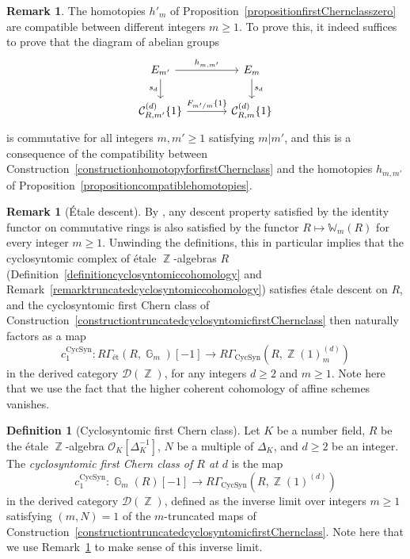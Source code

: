 \documentclass[10pt,twoside]{scrarticle}
\newlength{\mar} \setlength{\mar}{1cm}%
\newlength{\len}
\theoremstyle{definition}
\newtheorem{remark}[theorem]{Remark}
\newtheorem{definition}[theorem]{Definition}
\DeclareMathOperator{\Z}{\mathbb{Z}}
\DeclareMathOperator{\G}{\mathbb{G}}
\newcommand{\CycSyn}{\mathrm{CycSyn}}
\newcommand{\W}{\mathbb{W}}
\renewcommand{\ge}{\geqslant}
\numberwithin{equation}{theorem}
\begin{document}
\begin{remark}\label{remarklimitovermfirstChernclass}
    The homotopies $h'_m$ of Proposition~\ref{propositionfirstChernclasszero} are compatible between different integers $m \ge 1$. To prove this, it indeed suffices to prove that the diagram of abelian groups
    $$\begin{tikzcd}[column sep = large]
        E_{m'} \arrow[r,"h_{m,m'}"] \arrow[d,"s_d"'] & E_m \arrow[d,"s_d"] \\
    \mathcal{C}^{(d)}_{R,m'}\{1\} \arrow[r,"F_{m'/m}\{1\}"] & \mathcal{C}^{(d)}_{R,m}\{1\}
    \end{tikzcd}$$
    is commutative for all integers $m,m' \ge 1$ satisfying $m|m'$, and this is a consequence of the compatibility between Construction~\ref{constructionhomotopyforfirstChernclass} and the homotopies $h_{m,m'}$ of Proposition~\ref{propositioncompatiblehomotopies}.
\end{remark}

\begin{remark}[\'Etale descent]\label{remarketaledescent}
    By \cite[Proposition~2.15]{wagner_q-witt_2024}, any descent property satisfied by the identity functor on commutative rings is also satisfied by the functor $R \mapsto \W_m(R)$ for every integer $m \ge 1$. Unwinding the definitions, this in particular implies that the cyclosyntomic complex of étale $\Z$\nobreakdash-algebras $R$ (Definition~\ref{definitioncyclosyntomiccohomology} and Remark~\ref{remarktruncatedcyclosyntomiccohomology}) satisfies étale descent on $R$, and the cyclosyntomic first Chern class of Construction~\ref{constructiontruncatedcyclosyntomicfirstChernclass} then naturally factors as a map
    $$c_1^{\CycSyn} : R\Gamma_{\text{ét}}(R,\G_m)[-1] \longrightarrow R\Gamma_{\CycSyn}(R,\Z(1)^{(d)}_m)$$
    in the derived category $\mathcal{D}(\Z)$, for any integers $d \ge 2$ and $m \ge 1$. Note here that we use the fact that the higher coherent cohomology of affine schemes vanishes.
\end{remark}

\begin{definition}[Cyclosyntomic first Chern class]\label{definitioncyclosyntomicfirstChernclass}
    Let $K$ be a number field, $R$ be the étale $\Z$\nobreakdash-algebra $\mathcal{O}_K[\Delta_K^{-1}]$, $N$ be a multiple of $\Delta_K$, and $d \ge 2$ be an integer. The \emph{cyclosyntomic first Chern class of $R$ at $d$} is the map
    $$c_1^{\CycSyn} : \G_m(R)[-1] \longrightarrow R\Gamma_{\CycSyn}(R,\Z(1)^{(d)})$$
    in the derived category $\mathcal{D}(\Z)$, defined as the inverse limit over integers $m \ge 1$ satisfying $(m,N)=1$ of the $m$-truncated maps of Construction~\ref{constructiontruncatedcyclosyntomicfirstChernclass}. Note here that we use Remark~\ref{remarklimitovermfirstChernclass} to make sense of this inverse limit.
\end{definition}
\end{document}
